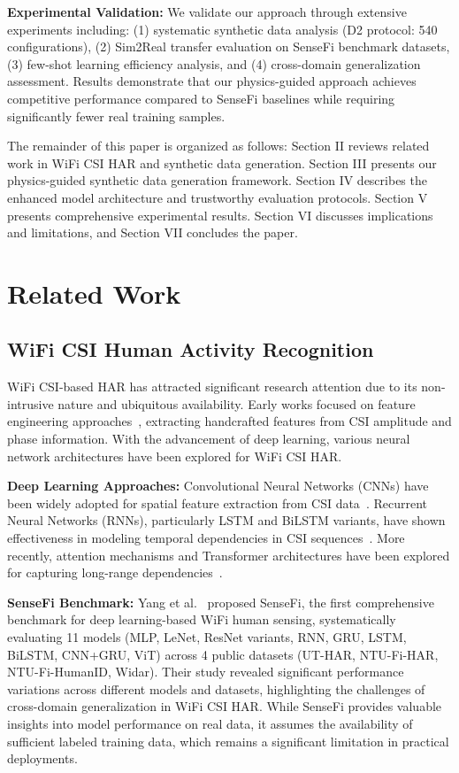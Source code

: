 \documentclass[journal]{IEEEtran}
\begin{document}
\textbf{Experimental Validation:} We validate our approach through extensive experiments including: (1) systematic synthetic data analysis (D2 protocol: 540 configurations), (2) Sim2Real transfer evaluation on SenseFi benchmark datasets, (3) few-shot learning efficiency analysis, and (4) cross-domain generalization assessment. Results demonstrate that our physics-guided approach achieves competitive performance compared to SenseFi baselines while requiring significantly fewer real training samples.

The remainder of this paper is organized as follows: Section II reviews related work in WiFi CSI HAR and synthetic data generation. Section III presents our physics-guided synthetic data generation framework. Section IV describes the enhanced model architecture and trustworthy evaluation protocols. Section V presents comprehensive experimental results. Section VI discusses implications and limitations, and Section VII concludes the paper.

\section{Related Work}

\subsection{WiFi CSI Human Activity Recognition}

WiFi CSI-based HAR has attracted significant research attention due to its non-intrusive nature and ubiquitous availability. Early works focused on feature engineering approaches~\cite{csi_basics2016}, extracting handcrafted features from CSI amplitude and phase information. With the advancement of deep learning, various neural network architectures have been explored for WiFi CSI HAR.

\textbf{Deep Learning Approaches:} Convolutional Neural Networks (CNNs) have been widely adopted for spatial feature extraction from CSI data~\cite{clnet2021}. Recurrent Neural Networks (RNNs), particularly LSTM and BiLSTM variants, have shown effectiveness in modeling temporal dependencies in CSI sequences~\cite{rewis2022}. More recently, attention mechanisms and Transformer architectures have been explored for capturing long-range dependencies~\cite{autofi2022}.

\textbf{SenseFi Benchmark:} Yang et al.~\cite{yang2023sensefi} proposed SenseFi, the first comprehensive benchmark for deep learning-based WiFi human sensing, systematically evaluating 11 models (MLP, LeNet, ResNet variants, RNN, GRU, LSTM, BiLSTM, CNN+GRU, ViT) across 4 public datasets (UT-HAR, NTU-Fi-HAR, NTU-Fi-HumanID, Widar). Their study revealed significant performance variations across different models and datasets, highlighting the challenges of cross-domain generalization in WiFi CSI HAR. While SenseFi provides valuable insights into model performance on real data, it assumes the availability of sufficient labeled training data, which remains a significant limitation in practical deployments.
\end{document}
